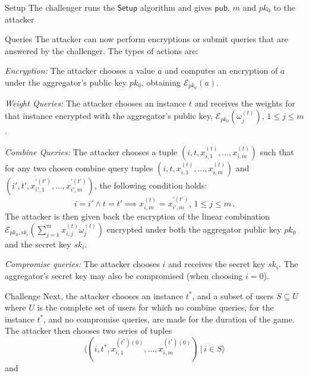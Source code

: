 \documentclass[10pt,journal,compsoc]{IEEEtran}
\theoremstyle{definition}
\theoremstyle{definition}
\theoremstyle{remark}
\begin{document}
\begin{LaTeXdescription}
    \item[Setup] The challenger runs the $\mathsf{Setup}$ algorithm and gives $\mathsf{pub}$, $m$ and $pk_0$ to the attacker
    \item[Queries] The attacker can now perform encryptions or submit queries that are answered by the challenger. The types of actions are:
    \begin{LaTeXenumerate}
        \item \textit{Encryption:} The attacker chooses a value $a$ and computes an encryption of $a$ under the aggregator's public key $pk_0$, obtaining $\mathcal{E}_{pk_0}(a)$.
        \item \textit{Weight Queries:} The attacker chooses an instance $t$ and receives the weights for that instance encrypted with the aggregator's public key, $\mathcal{E}_{pk_0}(\omega^{(t)}_{j}),\,1\leq j\leq m$.
        \item \textit{Combine Queries:} The attacker chooses a tuple $(i,t,x^{(t)}_{i,1},\dots,x^{(t)}_{i,m})$ such that for any two chosen combine query tuples $(i,t,x^{(t)}_{i,1},\dots,x^{(t)}_{i,m})$ and $(i',t',x^{\prime(t')}_{i',1},\dots,x^{\prime(t')}_{i',m})$, the following condition holds:
        \begin{equation*}
            i = i' \wedge t = t' \implies x^{(t)}_{i,m} = x^{\prime(t')}_{i',m},\,1\leq j\leq m\,.
        \end{equation*}
        The attacker is then given back the encryption of the linear combination $\mathcal{E}_{pk_0,sk_i}(\sum^m_{j=1}x^{(t)}_{i,j}\omega^{(t)}_j)$ encrypted under both the aggregator public key $pk_0$ and the secret key $sk_i$.
        \item \textit{Compromise queries:} The attacker chooses $i$ and receives the secret key $sk_i$. The aggregator's secret key may also be compromised (when choosing $i=0$).
    \end{LaTeXenumerate} 
    \item[Challenge] Next, the attacker chooses an instance $t^*$, and a subset of users $S \subseteq U$ where $U$ is the complete set of users for which no combine queries, for the instance $t^*$, and no compromise queries, are made for the duration of the game. The attacker then chooses two series of tuples
    \begin{equation*}
        \langle(i,t^*,x^{(t^*)(0)}_{i,1},\dots,x^{(t^*)(0)}_{i,m})\,|\,i \in S\rangle
    \end{equation*}
    and

\end{LaTeXdescription}
\end{document}
